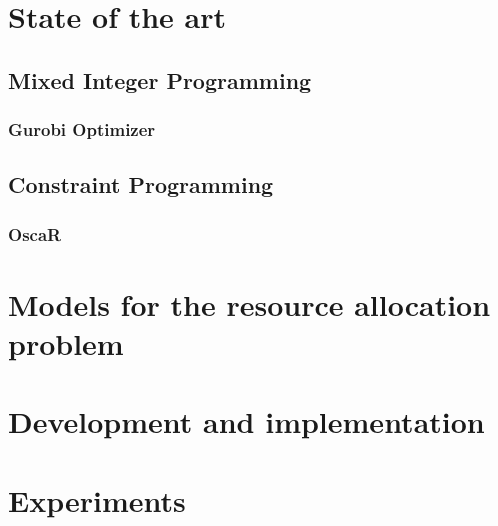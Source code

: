 \documentclass{template/EPL-master-thesis-covers-EN}
\begin{document}
  \chapter{State of the art}
  \label{chapter:sota}

  

  \section{Mixed Integer Programming}
  

  \subsection{Gurobi Optimizer}
  \label{subsection:gurobi}
  

  \section{Constraint Programming}
  

  \subsection{OscaR}
  \label{subsection:oscar}
  
  
  \chapter{Models for the resource allocation problem}
  \label{chapter:models}

  
  
  

  \chapter{Development and implementation}
  \label{chapter:implementation}
  


  \chapter{Experiments}
  \label{chapter:experiments}
  
  
\end{document}

